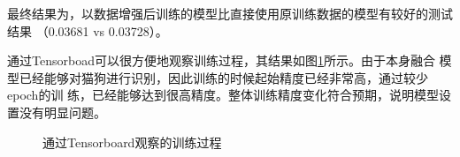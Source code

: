 \documentclass[a4paper,11pt]{article}
\begin{document}
最终结果为，以数据增强后训练的模型比直接使用原训练数据的模型有较好的测试结果
（0.03681 vs 0.03728）。

通过Tensorboad可以很方便地观察训练过程，其结果如图\ref{fig:tb}所示。由于本身融合
模型已经能够对猫狗进行识别，因此训练的时候起始精度已经非常高，通过较少epoch的训
练，已经能够达到很高精度。整体训练精度变化符合预期，说明模型设置没有明显问题。

\begin{figure}[htb]
\centering
{}
\caption{通过Tensorboard观察的训练过程}
\label{fig:tb}
\end{figure}
\end{document}
